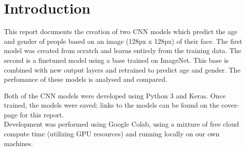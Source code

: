 





\section{Introduction}
This report documents the creation of two CNN models which predict the age and gender of people based on an image (128px x 128px) of their face. The first model was created from scratch and learns entirely from the training data. The second is a finetuned model using a base trained on ImageNet. This base is combined with new output layers and retrained to predict age and gender. The perfomance of these models is analysed and compared.


Both of the CNN models were developed using Python 3 and Keras. Once trained, the models were saved; links to the models can be found on the cover-page for this report.\\
Development was performed using Google Colab, using a mixture of free cloud compute time (utilizing GPU resources) and running locally on our own machines. 

    
